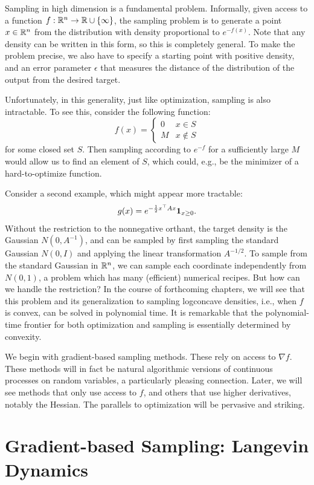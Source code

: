 Sampling in high dimension is a fundamental problem. Informally, given
access to a function $f:\mathbb{R}^{n}\rightarrow\mathbb{R}\cup\left\{ \infty\right\} $,
the sampling problem is to generate a point $x\in\mathbb{R}^{n}$ from the
distribution with density proportional to $e^{-f(x)}$. Note that
any density can be written in this form, so this is completely general.
To make the problem precise, we also have to specify a starting point
with positive density, and an error parameter $\epsilon$ that measures
the distance of the distribution of the output from the desired target. 

Unfortunately, in this generality, just like optimization, sampling
is also intractable. To see this, consider the following function:
\[
f(x)=\begin{cases}
0 & x\in S\\
M & x\not\in S
\end{cases}
\]
for some closed set $S$. Then sampling according to $e^{-f}$ for
a sufficiently large $M$ would allow us to find an element of $S$,
which could, e.g., be the minimizer of a hard-to-optimize function.

Consider a second example, which might appear more tractable: 
\[
g(x)=e^{-\frac{1}{2}x^{\top}Ax}\mathbb{{\bf 1}}_{x\ge0}.
\]
Without the restriction to the nonnegative orthant, the target density
is the Gaussian $N(0,A^{-1})$, and can be sampled by first sampling
the standard Gaussian $N(0,I)$ and applying the linear transformation
$A^{-1/2}$. To sample from the standard Gaussian in $\mathbb{R}^{n}$, we
can sample each coordinate independently from $N(0,1)$, a problem
which has many (efficient) numerical recipes. But how can we handle
the restriction? In the course of forthcoming chapters, we will see
that this problem and its generalization to sampling logconcave densities,
i.e., when $f$ is convex, can be solved in polynomial time. It is
remarkable that the polynomial-time frontier for both optimization
and sampling is essentially determined by convexity.

We begin with gradient-based sampling methods. These rely on access
to $\nabla f$. These methods will in fact be natural algorithmic
versions of continuous processes on random variables, a particularly
pleasing connection. Later, we will see methods that only use access
to $f$, and others that use higher derivatives, notably the Hessian.
The parallels to optimization will be pervasive and striking.

\section{Gradient-based Sampling: Langevin Dynamics}

